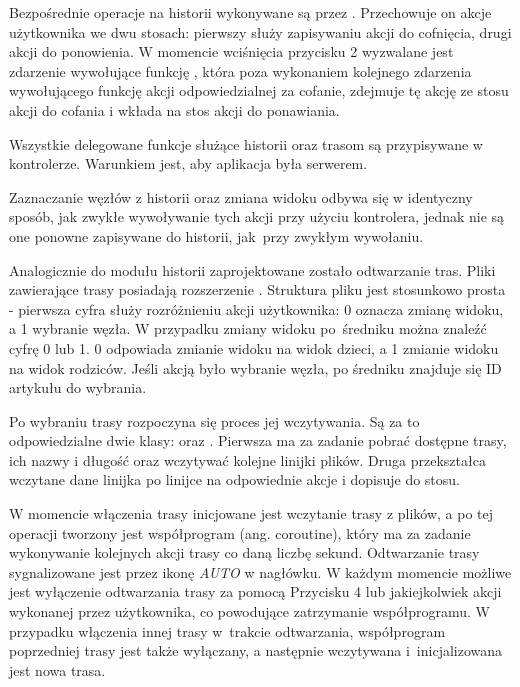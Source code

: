 Bezpośrednie operacje na historii wykonywane są przez . Przechowuje on akcje użytkownika we dwu stosach: pierwszy służy zapisywaniu akcji do cofnięcia, drugi akcji do ponowienia. W momencie wciśnięcia przycisku 2 wyzwalane jest zdarzenie wywołujące funkcję , która poza wykonaniem kolejnego zdarzenia wywołującego funkcję akcji odpowiedzialnej za cofanie, zdejmuje tę akcję ze stosu akcji do cofania i wkłada na stos akcji do ponawiania.

Wszystkie delegowane funkcje służące historii oraz trasom są przypisywane w kontrolerze\linebreak {}. Warunkiem jest, aby aplikacja była serwerem.

Zaznaczanie węzłów z historii oraz zmiana widoku odbywa się w identyczny sposób, jak zwykłe wywoływanie tych akcji przy użyciu kontrolera, jednak nie są one ponowne zapisywane do historii, jak~przy zwykłym wywołaniu.

Analogicznie do modułu historii zaprojektowane zostało odtwarzanie tras. Pliki zawierające trasy posiadają rozszerzenie . Struktura pliku jest stosunkowo prosta - pierwsza cyfra służy rozróżnieniu akcji użytkownika: 0 oznacza zmianę widoku, a 1 wybranie węzła. W przypadku zmiany widoku po~średniku można znaleźć cyfrę 0 lub 1. 0 odpowiada zmianie widoku na widok dzieci, a 1 zmianie widoku na widok rodziców. Jeśli akcją było wybranie węzła, po średniku znajduje się ID artykułu do wybrania. 


Po wybraniu trasy rozpoczyna się proces jej wczytywania. Są za to odpowiedzialne dwie klasy:  oraz . Pierwsza ma za zadanie pobrać dostępne trasy, ich nazwy i długość oraz wczytywać kolejne linijki plików. Druga przekształca wczytane dane linijka po linijce na odpowiednie akcje i dopisuje do stosu.

W momencie włączenia trasy inicjowane jest wczytanie trasy z plików, a po tej operacji tworzony jest współprogram (ang. coroutine), który ma za zadanie wykonywanie kolejnych akcji trasy co daną liczbę sekund. Odtwarzanie trasy sygnalizowane jest przez ikonę \textit{AUTO} w nagłówku. W każdym momencie możliwe jest wyłączenie odtwarzania trasy za pomocą Przycisku 4 lub jakiejkolwiek akcji wykonanej przez użytkownika, co powodujące zatrzymanie współprogramu. W przypadku włączenia innej trasy w~trakcie odtwarzania, współprogram poprzedniej trasy jest także wyłączany, a następnie wczytywana i~inicjalizowana jest nowa trasa. 
